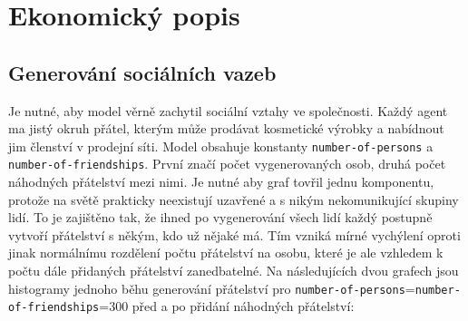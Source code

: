\documentclass[a4wide,12pt]{report}
\begin{document}
\section{Ekonomický popis}
\subsection{Generování sociálních vazeb}
Je nutné, aby model věrně zachytil sociální vztahy ve společnosti. Každý agent ma jistý okruh přátel, kterým může prodávat kosmetické výrobky a nabídnout jim členství v prodejní síti. Model obsahuje konstanty \texttt{number-of-persons} a \texttt{number-of-friendships}. První značí počet vygenerovaných osob, druhá počet náhodných přátelství mezi nimi. Je nutné aby graf tovřil jednu komponentu, protože na světě prakticky neexistují uzavřené a s nikým nekomunikující skupiny lidí. To je zajištěno tak, že ihned po vygenerování všech lidí každý postupně vytvoří přátelství s někým, kdo už nějaké má. Tím vzniká mírné vychýlení oproti jinak normálnímu rozdělení počtu přátelství na osobu, které je ale vzhledem k počtu dále přidaných přátelství zanedbatelné. Na následujících dvou grafech jsou histogramy jednoho běhu generování přátelství pro \texttt{number-of-persons}=\texttt{number-of-friendships}=300 před a po přidání náhodných přátelství:\\
\end{document}
